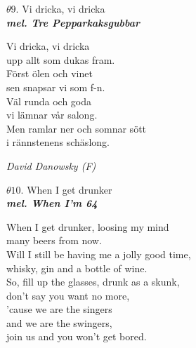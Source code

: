 \documentclass[a6paper,10pt]{article}
\newcommand{\mel}[1]{\small\textbf{\textit{mel. #1 \\}}}
\begin{document}
\setlength{\oddsidemargin}{-0.47in}
\begin{center}
\Large $\theta9$. Vi dricka, vi dricka\\ 
\mel{Tre Pepparkaksgubbar}
\end{center}
Vi dricka, vi dricka\\
upp allt som dukas fram.\\
Först ölen och vinet\\
sen snapsar vi som f-n.\\
Väl runda och goda\\
vi lämnar vår salong.\\
Men ramlar ner och somnar sött\\
i rännstenens schäslong.
\begin{flushright}
\textit{David Danowsky (F)}
\end{flushright}
\vspace{40pt}
\begin{center}
\Large $\theta10$. When I get drunker\\
\mel{When I'm 64} 
\end{center}
When I get drunker, loosing my mind\\
many beers from now.\\
Will I still be having me a jolly good time,\\
whisky, gin and a bottle of wine.\\
So, fill up the glasses, drunk as a skunk,\\
don't say you want no more,\\
'cause we are the singers\\
and we are the swingers,\\
join us and you won't get bored.
\end{document}
